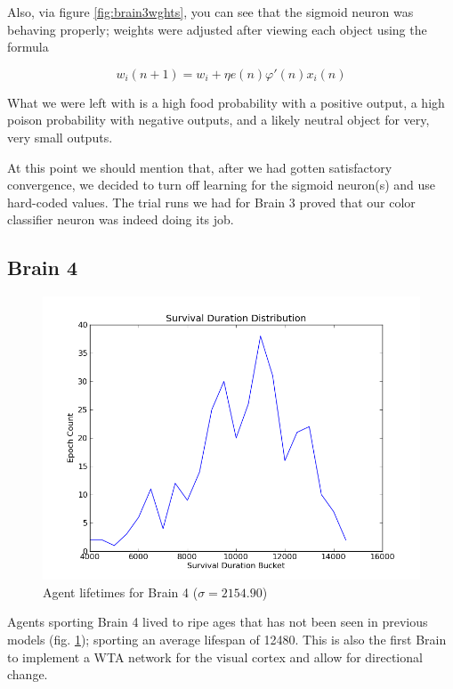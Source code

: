 Also, via figure \ref{fig:brain3wghts}, you can see that the sigmoid neuron 
was behaving properly; weights were
adjusted after viewing each object using the formula\cite{Haykin}

\begin{equation}
  w_i(n+1) = w_i + \eta e(n) \varphi'(n) x_i(n)
\end{equation}

What we were left with is a high food probability with a positive output,
a high poison probability with negative outputs, and a likely neutral object 
for very, very small outputs.

At this point we should mention that, after we had gotten satisfactory 
convergence, we decided to turn off learning for the sigmoid neuron(s) and use 
hard-coded values. The trial runs we had for Brain 3 proved that our color
classifier neuron was indeed doing its job.


\subsection{Brain 4}

\begin{figure}
\begin{center}
  \includegraphics[scale=.65]{plots/brain4hist.png}
  \caption{Agent lifetimes for Brain 4 ($\sigma = 2154.90$)}
  \label{fig:brain4his}
\end{center}
\end{figure}

Agents sporting Brain 4 lived to ripe ages that has not been seen in previous
models (fig. \ref{fig:brain4his}); sporting an average lifespan of 12480. This is also 
the first Brain 
to implement a WTA network for the visual cortex and allow for directional 
change.


